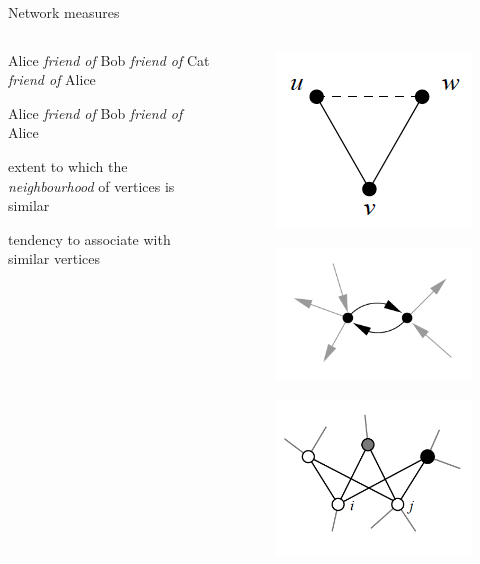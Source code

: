 \documentclass[serif, aspectratio=169]{beamer}
\begin{document}
\begin{frame}
{Network measures}

\begin{columns}
\begin{column}{0.6\textwidth}
  \begin{description}
  \item<1-> [Transitivity of edges] Alice \textit{friend of} Bob \textit{friend of} Cat \textit{friend of} Alice
\item<2-> [Reciprocity of edges] Alice  \textit{friend of} Bob \textit{friend of} Alice
\item<3-> [Similarity of vertices] extent to which the \textit{neighbourhood} of vertices is similar
\item<4-> [Homophily of vertices] tendency to associate with similar vertices
  \end{description}
\end{column}
\begin{column}{0.4\textwidth}
\begin{figure}
    \includegraphics[width=0.35\linewidth]{figure/transitivity.png}
\end{figure}
\begin{figure}
    \includegraphics[width=0.4\linewidth]{figure/reciprocity.png}
\end{figure}
\begin{figure}
    \includegraphics[width=0.4\linewidth]{figure/similarity.png}
\end{figure}
\end{column}
\end{columns}

\end{frame}
\end{document}
